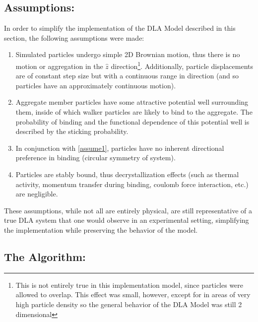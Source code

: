 \documentclass{article}
\begin{document}
\subsection{Assumptions: \label{assumptions}}

In order to simplify the implementation of the DLA Model described in this section, the following assumptions were made:

\begin{enumerate}
	\item{Simulated particles undergo simple 2D Brownian motion, thus there is no motion or aggregation in the $\hat{z}$ direction\footnote{This is not entirely true in this implementation model, since particles were allowed to overlap. This effect was small, however, except for in areas of very high particle density so the general behavior of the DLA Model was still 2 dimensional}. Additionally, particle displacements are of constant step size but with a continuous range in direction (and so particles have an approximately continuous motion).
	\label{assume1}}
	
	\item{Aggregate member particles have some attractive potential well surrounding them, inside of which walker particles are likely to bind to the aggregate. The probability of binding and the functional dependence of this potential well is described by the sticking probability.
	\label{assume2}}
	
	\item{In conjunction with \ref{assume1}, particles have no inherent directional preference in binding (circular symmetry of system).
	\label{assume3}}
	
	\item{Particles are stably bound, thus decrystallization effects (such as thermal activity, momentum transfer during binding, coulomb force interaction, etc.) are negligible.
	\label{assume4}}
	
\end{enumerate}

\noindent These assumptions, while not all are entirely physical, are still representative of a true DLA system that one would observe in an experimental setting, simplifying the implementation while preserving the behavior of the model.


\subsection{The Algorithm:}
\end{document}
